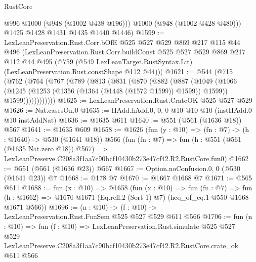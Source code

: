 \begin{lexlean}{RustCore}
\begin{coremodule}
          @996
          @1000
          (@948 (@1002 @438 @196)))
        @1000
        (@948 (@1002 @428 @480)))
      @1425
      @1428
      @1431
      @1435
      @1440
      @1446)
@1599 := LexLeanPreservation.Rust.Corr.bOfE
    @525
    @527
    @529
    @869
    @217
    @115
    @44
    @496
    (LexLeanPreservation.Rust.Corr.buildConst
      @525
      @527
      @529
      @869
      @217
      @112
      @44
      @495
      (@759 (@549 LexLeanTarget.RustSyntax.Lit) (LexLeanPreservation.Rust.constShape @112 @44)))
@1621 := @544
    (@715
      (@762
        (@764
          (@767
            (@789
              (@813
                (@831
                  (@870
                    (@882
                      (@887
                        (@1049
                          (@1066
                            (@1245 (@1253 (@1356 (@1364 (@1448 (@1572 @1599)) @1599)) @1599))
                            @1599))))))))))))
@1625 := LexLeanPreservation.Rust.CrateOK @525 @527 @529
@1626 := Nat.casesOn.{0}
@1635 := HAdd.hAdd.{0, 0, 0} @10 @10 @10 (instHAdd.{0} @10 instAddNat)
@1636 := @1635 @611
@1640 := @551 (@561 (@1636 @18)) @567
@1641 := @1635 @609
@1658 := @1626
    (fun (y : @10) => (fn : @7) -> (h : @1640) -> @530 (@1641 @18))
    @566
    (fun (fn : @7) =>
    fun (h : @551 (@561 (@1635 Nat.zero @18)) @567) =>
    LexLeanPreserve.C208a3f1aa7c90bcf10430b273e47cf42.R2.RustCore.fun0)
@1662 := @551 (@561 (@1636 @23)) @567
@1667 := Option.noConfusion.{0, 0} (@530 (@1641 @23)) @7
@1668 := @178 @7
@1670 := @1667 @1668 @7
@1671 := @565 @611
@1688 := fun (x : @10) =>
  @1658
    (fun (x : @10) =>
    fun (fn : @7) =>
    fun (h : @1662) => @1670 @1671 (Eq.refl.{2} (Sort 1) @7) (heq_of_eq.{1} @550 @1668 @1671 @566))
@1696 := (n : @10) -> (f : @10) -> LexLeanPreservation.Rust.FunSem @525 @527 @529 @611 @566
@1706 := fun (n : @10) =>
  fun (f : @10) =>
  LexLeanPreservation.Rust.simulate
    @525
    @527
    @529
    LexLeanPreserve.C208a3f1aa7c90bcf10430b273e47cf42.R2.RustCore.crate_ok
    @611
    @566
\end{coremodule}
\end{lexlean}
